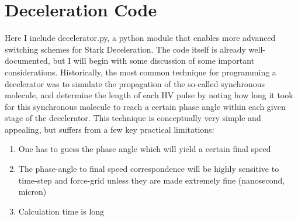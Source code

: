 \chapter{Deceleration Code}	\OnePageChapter         %

Here I include decelerator.py, a python module that enables more advanced switching schemes for Stark Deceleration. The code itself is already well-documented, but I will begin with some discussion of some important considerations. Historically, the most common technique for programming a decelerator was to simulate the propagation of the so-called synchronous molecule, and determine the length of each HV pulse by noting how long it took for this synchronous molecule to reach a certain phase angle within each given stage of the decelerator. This technique is conceptually very simple and appealing, but suffers from a few key practical limitations:
\begin{enumerate}
\item One has to guess the phase angle which will yield a certain final speed
\item The phase-angle to final speed correspondence will be highly sensitive to time-step and force-grid unless they are made extremely fine (nanosecond, micron)
\item Calculation time is long
\end{enumerate}


